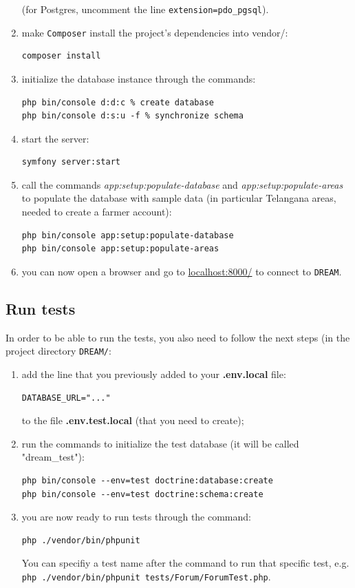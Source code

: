 \documentclass{article}
\begin{document}
\begin{enumerate}
(for Postgres, uncomment the line \verb|extension=pdo_pgsql|).
    \item make \verb|Composer| install the project's dependencies into vendor/:
    \begin{verbatim}
composer install
    \end{verbatim}
\item initialize the database instance through the commands:
    \begin{verbatim}
php bin/console d:d:c % create database
php bin/console d:s:u -f % synchronize schema
    \end{verbatim}
\item start the server:
    \begin{verbatim}
symfony server:start
    \end{verbatim}
    \item call the commands \textit{app:setup:populate-database} and \textit{app:setup:populate-areas} to populate the database with sample data (in particular Telangana areas, needed to create a farmer account):
    \begin{verbatim}
php bin/console app:setup:populate-database
php bin/console app:setup:populate-areas
    \end{verbatim}
\item you can now open a browser and go to \url{localhost:8000/} to connect to \verb|DREAM|.
\end{enumerate}
\subsection{Run tests}
In order to be able to run the tests, you also need to follow the next steps (in the project directory \verb|DREAM/|:
\begin{enumerate}
    \item add the line that you previously added to your \textbf{.env.local} file:
\begin{verbatim}
DATABASE_URL="..."
\end{verbatim}
to the file \textbf{.env.test.local} (that you need to create);
\item run the commands to initialize the test database (it will be called "dream\_test"):
\begin{verbatim}
php bin/console --env=test doctrine:database:create
php bin/console --env=test doctrine:schema:create
\end{verbatim}
\item you are now ready to run tests through the command:
\begin{verbatim}
php ./vendor/bin/phpunit
\end{verbatim}
You can specifiy a test name after the command to run that specific test, e.g. \verb|php ./vendor/bin/phpunit tests/Forum/ForumTest.php|.
\end{enumerate}
\newpage
\end{document}
